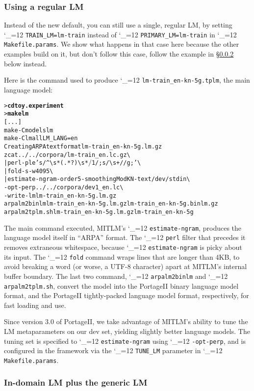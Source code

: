 \documentclass[11pt,letterpaper]{article}
\newcommand{\bs}{\textbackslash{}}
\newcommand{\PS}{PortageII\xspace}
\def\code{\begingroup\catcode`\_=12 \codex}
\newcommand{\codex}[1]{\texttt{#1}\endgroup}
\begin{document}
\subsubsection{Using a regular LM} \label{regularLM}

Instead of the new default, you can still use a single, regular LM, by setting
\code{TRAIN_LM=lm-train} instead of \code{PRIMARY_LM=lm-train} in
\code{Makefile.params}. We show what happens in that case here because the
other examples build on it, but don't follow this case, follow the example in
\S\ref{LM+generic-default} below instead.

Here is the command used to produce
\code{lm-train_en-kn-5g.tplm},
the main language model:
\begin{small}
\begin{alltt}
   > \textbf{cd toy.experiment}
   > \textbf{make lm}
   [...]
   make -C models lm
   make -C lm all LM_LANG=en
   Creating ARPA text format lm-train_en-kn-5g.lm.gz
   zcat ../../corpora/lm-train_en.lc.gz \bs
      | perl -ple 's/^{\bs}s*(.*?){\bs}s*$/$1/; s/{\bs}s+/ /g;' \bs
      | fold -s -w 4095 \bs
      | estimate-ngram -order 5 -smoothing ModKN -text /dev/stdin \bs
        -opt-perp ../../corpora/dev1_en.lc \bs
        -write-lm lm-train_en-kn-5g.lm.gz
   arpalm2binlm lm-train_en-kn-5g.lm.gz lm-train_en-kn-5g.binlm.gz
   arpalm2tplm.sh lm-train_en-kn-5g.lm.gz lm-train_en-kn-5g
\end{alltt}
\end{small}
The main command executed, MITLM's \code{estimate-ngram}, produces the language
model itself in ``ARPA'' format.  The \code{perl} filter that precedes it
removes extraneous whitespace, because \code{estimate-ngram} is picky about its
input.  The \code{fold} command wraps lines that are longer than 4KB, to avoid
breaking a word (or worse, a UTF-8 character) apart at MITLM's internal buffer
boundary.  The last two command, \code{arpalm2binlm} and \code{arpalm2tplm.sh},
convert the model into the \PS binary language model format, and the \PS
tightly-packed language model format, respectively, for fast loading and use.

Since version 3.0 of \PS, we take advantage of MITLM's ability to tune the LM
metaparameters on our dev set, yielding slightly better language models.  The
tuning set is specified to \code{estimate-ngram} using \code{-opt-perp}, and is
configured in the framework via the \code{TUNE_LM} parameter in
\code{Makefile.params}.

\subsubsection{In-domain LM plus the generic LM} \label{LM+generic-default}
\end{document}
